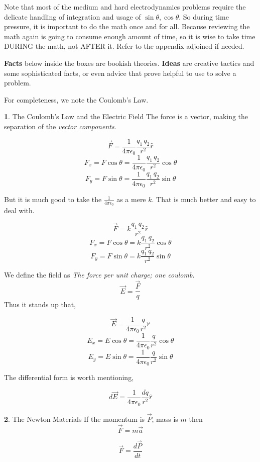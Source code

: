 \documentclass[11pt,a4paper,landscape,twocolumn]{article}
\theoremstyle{definition}
\newtheorem{fct}{ \framebox[0.05\textwidth]{{\sffamily Fact}} }
\theoremstyle{definition}
\theoremstyle{definition}
\theoremstyle{definition}
\begin{document}
Note that most of the medium and hard electrodynamics problems require the delicate handling of integration and usage of $\sin \theta, \cos \theta$. So during time pressure, it is important to do the math once and for all. Because reviewing the math again is going to consume enough amount of time, so it is wise to take time DURING the math, not AFTER it. Refer to the appendix adjoined if needed.

\textbf{Facts} below inside the boxes are bookish theories. \textbf{Ideas} are creative tactics and some sophisticated facts, or even advice that prove helpful to use to solve a problem.

For completeness, we note the Coulomb's Law.


\begin{fct}
\textsf{The Coulomb's Law and the Electric Field}
%
The force is a vector, making the separation of the \emph{vector components}.


\[ \vec{F} = \frac{1}{4 \pi \epsilon_0} \frac{q_1 \, q_2}{r^2} \hat{r} \]
\[ F_x = F \cos \theta  = \frac{1}{4 \pi \epsilon_0} \frac{q_1 \, q_2}{r^2} \cos \theta \]
\[ F_y = F \sin \theta = \frac{1}{4 \pi \epsilon_0} \frac{q_1 \, q_2}{r^2} \sin \theta \]

But it is much good to take the $\frac{1}{4 \pi \epsilon_0}$ as a mere $k$. That is much better and easy to deal with.

\[ \vec{F} = k \frac{q_1 \, q_2}{r^2} \hat{r} \]
\[ F_x = F \cos \theta  = k \frac{q_1 \, q_2}{r^2} \cos \theta \]
\[ F_y = F \sin \theta = k \frac{q_1 \, q_2}{r^2} \sin \theta \]

We define the field as \emph{The force per unit charge; one coulomb}.
\[ \vec{E} = \frac{\vec{F}}{q} \]
Thus it stands up that, 

\[ \vec{E} = \frac{1}{4 \pi \epsilon_0} \frac{q}{r^2} \hat{r} \]
\[ E_x = E \cos \theta  = \frac{1}{4 \pi \epsilon_0} \frac{q}{r^2} \cos \theta \]
\[ E_y = E \sin \theta = \frac{1}{4 \pi \epsilon_0} \frac{q}{r^2} \sin \theta \]

The differential form is worth mentioning,

\[ d\vec{E} = \frac{1}{4 \pi \epsilon_0} \frac{dq}{r^2} \hat{r} \] 

\end{fct}

\begin{fct}
\textsf{The Newton Materials}
If the momentum is $\vec{P}$, mass is $m$ then 
\begin{equation}
\vec{F} = m \vec{a}
\end{equation}

\begin{equation}
\vec{F} = \frac{d \vec{P}}{dt}
\end{equation}

\end{fct}
\end{document}
